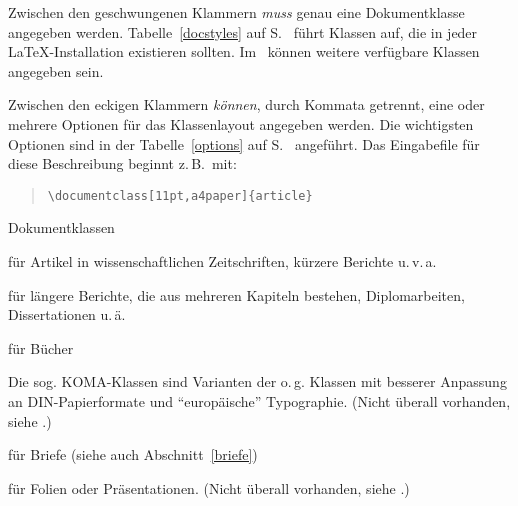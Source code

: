 Zwischen den geschwungenen Klammern \emph{muss} genau eine Dokumentklasse
angegeben werden.  Tabelle~\ref{docstyles} auf S.~\pageref{docstyles}
führt Klassen auf,
die in jeder \LaTeX-Installation existieren sollten.  
Im \local\ können weitere verfügbare 
Klassen angegeben sein.  
 
Zwischen den eckigen Klammern \emph{können}, durch Kommata getrennt, 
eine oder mehrere Optionen für das Klassenlayout
angegeben werden. Die wichtigsten Optionen sind in der 
Tabelle~\ref{options} auf S.~\pageref{options} angeführt.
Das Eingabefile für diese Beschreibung beginnt z.\,B.\ mit:
\begin{verse}
\verb|\documentclass[11pt,a4paper]{article}|
\end{verse}

\begin{table}[hbpt]
\caption{Dokumentklassen} \label{docstyles}
\oben{11cm}
\begin{ttdescription}%
\item [article] für Artikel in wissenschaftlichen Zeitschriften,
  kürzere Berichte u.\,v.\,a.
 
\item [report] für längere Berichte, die aus mehreren Kapiteln
  bestehen, Diplomarbeiten, Dissertationen u.\,ä.
 
\item [book] für Bücher

\item[scrartcl, scrreprt, scrbook]\quad Die sog. KOMA-Klassen 
sind Varianten der o.\,g. Klassen
mit besserer Anpassung an DIN-Papierformate und "`europäische"'
Typographie. 
(Nicht überall vorhanden, siehe \local.)


\item [letter] für Briefe (siehe auch Abschnitt~\ref{briefe})

\item [foils] für Folien oder Präsentationen.
(Nicht überall vorhanden, siehe \local.)
  
\end{ttdescription}
\unten
\end{table}

